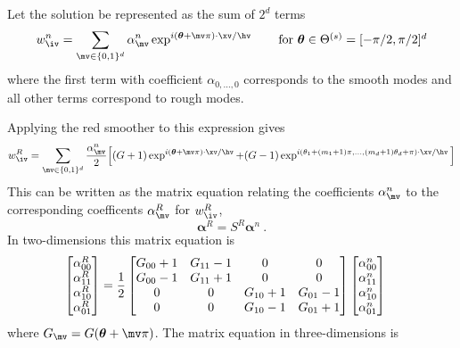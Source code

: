 \documentclass{article}
\begin{document}
Let the solution be represented as the sum of $2^d$ terms
\[
  w_{\iv}^{n} = \sum_{\mv\in\{0,1\}^d } \alpha_{\mv}^{n} \exp^{ i (\thetav+\mv\pi)\cdot\xv/\hv } 
              \qquad\mbox{for  $\thetav\in\Theta^{(s)} = [-\pi/2,\pi/2]^d$}
\]
where the first term with coefficient $\alpha_{0,\ldots,0}$ corresponds to the smooth modes
and all other terms correspond to rough modes.

\newcommand{\alphav}{\boldsymbol{\alpha}}
Applying the red smoother to this expression gives
\[
  w_{\iv}^R  = \sum_{\mv\in\{0,1\}^d } 
{\alpha_{\mv}^{n} \over2}\Big[ (G+1)\exp^{ i (\thetav+\mv\pi)\cdot\xv/\hv } 
           + (G-1)\exp^{ i (\theta_1+(m_1+1)\pi,\ldots,(m_d+1)\theta_d+\pi)\cdot\xv/\hv } \Big]
\]
This can be written as the matrix equation relating the coefficients $\alpha_\mv^n$ to
the corresponding coefficents $\alpha_\mv^R$ for $w_{\iv}^R$,
\[
   \alphav^R  = S^R \alphav^n ~.
\]
In two-dimensions this matrix equation is
\begin{align*}
  \left[\begin{matrix} \alpha_{00}^{R} \\ \alpha_{11}^{R}  \\ 
                       \alpha_{10}^{R} \\ \alpha_{01}^{R}
                         \end{matrix}\right] 
 &= {1\over 2}
   \left[\begin{matrix} G_{00}+1 & G_{11}-1 & 0 & 0  \\
                        G_{00}-1 & G_{11}+1 & 0 & 0  \\
                        0 & 0 &  G_{10}+1 & G_{01}-1 \\
                        0 & 0 &  G_{10}-1 & G_{01}+1 \\
           \end{matrix}\right]
  \left[\begin{matrix} \alpha_{00}^{n} \\ \alpha_{11}^{n}  \\ 
                       \alpha_{10}^{n}  \\ \alpha_{01}^{n}  \end{matrix}\right] 
\end{align*}
where $G_\mv = G(\thetav+\mv\pi)$. 
The matrix equation in three-dimensions is
\newcommand{\zerov}{{\mathbf 0}}
\end{document}
